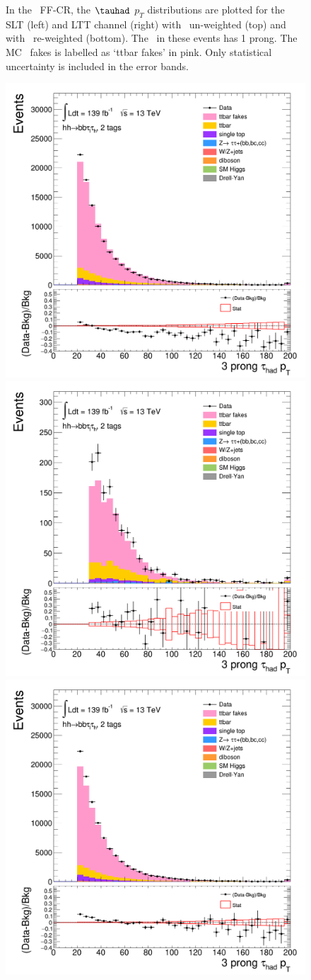 \begin{figure}[htbp]
\caption{In the \ttbar\ FF-CR, the $\tauhad$ $p_T$ distributions are plotted 
for the SLT (left) and LTT channel (right) 
with \ttbar\ un-weighted (top) 
and with \ttbar\ re-weighted (bottom).
The \tauhad\ in these events has 1 prong. 
The MC \ttbar\ fakes is labelled as `ttbar fakes' in pink.
Only statistical uncertainty is included in the error bands.}
\label{fig:ttbarCR_1}
\end{figure} 
\begin{figure}[htbp]
\centering
\includegraphics[width=.48\textwidth]{DiHiggs/plots/FF_CRs/ttbarCR_SLT/HNone/BDTVarsHighMbb/2/C_2tag2pjet_0ptv_TauPt3P.png}
\includegraphics[width=.48\textwidth]{DiHiggs/plots/FF_CRs/ttbarCR_LTT/HNone/BDTVarsHighMbb/2/C_2tag2pjet_0ptv_TauPt3P.png}\\
\includegraphics[width=.48\textwidth]{DiHiggs/plots/FF_CRs/ttbarCR_SLT_weighted/HNone/BDTVarsHighMbb/2/C_2tag2pjet_0ptv_TauPt3P.png}

\end{figure}
